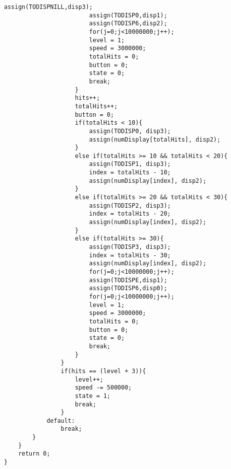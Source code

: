 \begin{lstlisting}[style=CStyle]
                        assign(TODISPNILL,disp3);
                        assign(TODISP0,disp1);
                        assign(TODISP6,disp2);
                        for(j=0;j<10000000;j++);
                        level = 1;
                        speed = 3000000;
                        totalHits = 0;
                        button = 0;
                        state = 0;
                        break;
                    }
                    hits++;
                    totalHits++;
                    button = 0;
                    if(totalHits < 10){
                        assign(TODISP0, disp3);
                        assign(numDisplay[totalHits], disp2);    
                    }
                    else if(totalHits >= 10 && totalHits < 20){
                        assign(TODISP1, disp3);
                        index = totalHits - 10;
                        assign(numDisplay[index], disp2);  
                    }
                    else if(totalHits >= 20 && totalHits < 30){
                        assign(TODISP2, disp3);
                        index = totalHits - 20;
                        assign(numDisplay[index], disp2);  
                    }
                    else if(totalHits >= 30){
                        assign(TODISP3, disp3);
                        index = totalHits - 30;
                        assign(numDisplay[index], disp2);
                        for(j=0;j<10000000;j++); 
                        assign(TODISPE,disp1);
                        assign(TODISP6,disp0);
                        for(j=0;j<10000000;j++);
                        level = 1;
                        speed = 3000000;
                        totalHits = 0;
                        button = 0;
                        state = 0;
                        break;
                    }
                }
                if(hits == (level + 3)){
                    level++;
                    speed -= 500000;
                    state = 1;
                    break;
                }
            default:
                break;
        }
    }
    return 0;
}
\end{lstlisting}

